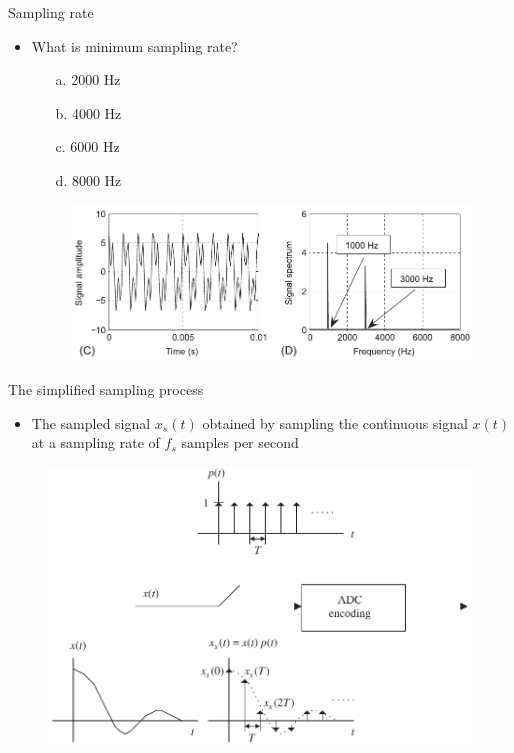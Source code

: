\documentclass[pdflatex,compress,mathserif]{beamer}
\begin{document}
\begin{frame}{Sampling rate}
    \begin{itemize}
        \item What is minimum sampling rate?
        \begin{multicols}{2}
            \begin{enumerate}
                \item[a.] 2000 Hz
                \item[b.] 4000 Hz
                \columnbreak
                \item[c.] 6000 Hz
                \item[d.] 8000 Hz
            \end{enumerate}
        \end{multicols}
        \begin{figure}
            \includegraphics[width=\linewidth]{./img/img07}
        \end{figure}
    \end{itemize}
\end{frame}

\begin{frame}{The simplified sampling process}
    \begin{itemize}
        \item The sampled signal $x_s(t)$ obtained by sampling the continuous signal $x(t)$ at a sampling rate of $f_s$ samples per second
    \end{itemize}
    \begin{figure}
        \includegraphics[width=0.8\linewidth]{./img/img08}
    \end{figure}
\end{frame}
\end{document}
